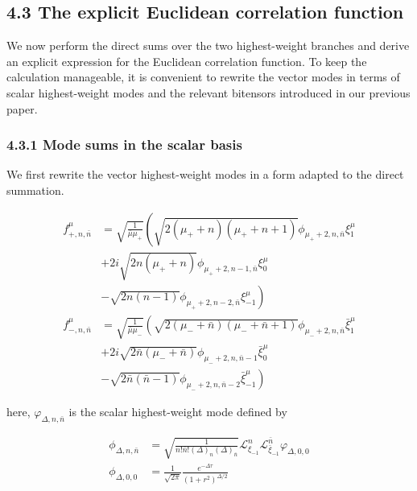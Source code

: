 \subsection{4.3 The explicit Euclidean correlation function}\label{subsec:explicit-euclidean-correlation-function}

We now perform the direct sums over the two highest-weight branches and derive an explicit expression for the Euclidean correlation function. To keep the calculation manageable, it is convenient to rewrite the vector modes in terms of scalar highest-weight modes and the relevant bitensors introduced in our previous paper.

\subsubsection{4.3.1 Mode sums in the scalar basis}\label{subsubsec:mode-sums-scalar-basis}

We first rewrite the vector highest-weight modes in a form adapted to the direct summation.

\begin{align}
f_{+,n,\bar{n}}^{\mu} & =\sqrt{ \frac{1}{\bar{\mu}\mu _{+}} }\left(\sqrt{ 2(\mu _{+}+n)(\mu _{+}+n+1) }\phi _{\mu _{+}+2,n,\bar{n}}\xi _{1}^{\mu}\right. \\
 & +2i\sqrt{ 2n(\mu _{+}+n) }\phi _{\mu _{+}+2,n-1,\bar{n}}\xi _{0}^{\mu} \\
 & \left.-\sqrt{ 2n(n-1) }\phi _{\mu _{+}+2,n-2,\bar{n}}\xi _{-1}^{\mu}\right) \\
f_{-,n,\bar{n}}^{\mu} & =\sqrt{ \frac{1}{\bar{\mu}\mu _{-}} }\left(\sqrt{ 2(\mu _{-}+\bar{n})(\mu _{-}+\bar{n}+1) }\phi _{\mu _{-}+2,n,\bar{n}}\bar{\xi}_{1}^{\mu}\right. \\
 & +2i\sqrt{ 2\bar{n}(\mu _{-}+\bar{n}) }\phi _{\mu _{-}+2,n,\bar{n}-1}\bar{\xi}_{0}^{\mu} \\
 & \left.-\sqrt{ 2\bar{n}(\bar{n}-1) }\phi _{\mu _{-}+2,n,\bar{n}-2}\bar{\xi}_{-1}^{\mu}\right)
\end{align}

here, $\displaystyle{\varphi _{\Delta,n,\bar{n}}}$ is the scalar highest-weight mode defined by

\begin{align}
\phi _{\Delta,n,\bar{n}} & =\sqrt{ \frac{1}{n!\bar{n}!(\Delta)_{n}(\Delta)_{\bar{n}}} }\mathcal{L}_{\xi _{-1}}^{n}\mathcal{L}_{\bar{\xi}_{-1}}^{\bar{n}}\varphi _{\Delta,0,0} \\
\phi _{\Delta,0,0} & =\frac{1}{\sqrt{ 2\pi }}\frac{e^{-\Delta \tau}}{(1+r^{2})^{\Delta /2}}
\end{align}


